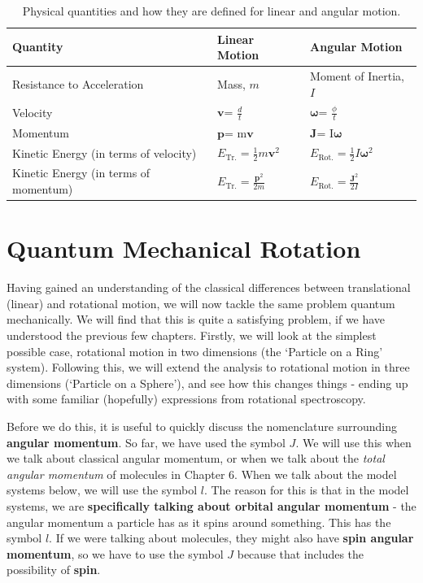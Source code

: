 \documentclass{memoir}[11pt,oneside,a4paper,openany]
\newcommand{\bv}{\ensuremath{\bm{v}}}
\newcommand{\bp}{\ensuremath{\bm{p}}}
\newcommand{\bj}{\ensuremath{\bm{J}}}
\newcommand{\bw}{\ensuremath{\bm{\omega}}}
\begin{document}
\begin{table}[]
\centering
\begin{tabular}{@{}lll@{}}
\toprule
Quantity & Linear Motion & Angular Motion \\ \midrule
Resistance to Acceleration & Mass, $m$ & Moment of Inertia, $I$  \\
Velocity  & \bv = $\frac{d}{t}$ & \bw = $\frac{\phi}{t}$ \\
Momentum & \bp = m\bv & \bj = I\bw \\
Kinetic Energy (in terms of velocity) & $E_{\text{Tr.}} = \frac{1}{2}m\bv^2$ & $E_{\text{Rot.}} = \frac{1}{2}I\bw^2$  \\
Kinetic Energy (in terms of momentum) & $E_{\text{Tr.}} = \frac{\bp^2}{2m}$ & $E_{\text{Rot.}} = \frac{\bj^2}{2I}$ \\ \bottomrule
\end{tabular}
	\caption{Physical quantities and how they are defined for linear and angular motion.}\label{tab:lin_ang}
\end{table}


\section{Quantum Mechanical Rotation}
Having gained an understanding of the classical differences between translational (linear) and rotational motion, we will now tackle the same problem quantum mechanically. We will find that this is quite a satisfying problem, if we have understood the previous few chapters. Firstly, we will look at the simplest possible case, rotational motion in two dimensions (the `Particle on a Ring' system). Following this, we will extend the analysis to rotational motion in three dimensions (`Particle on a Sphere'), and see how this changes things - ending up with some familiar (hopefully) expressions from rotational spectroscopy. 

Before we do this, it is useful to quickly discuss the nomenclature surrounding \textbf{angular momentum}. So far, we have used the symbol $J$. We will use this when we talk about classical angular momentum, or when we talk about the \emph{total angular momentum} of molecules in Chapter 6. When we talk about the model systems below, we will use the symbol $l$. The reason for this is that in the model systems, we are \textbf{specifically talking about orbital angular momentum} - the angular momentum a particle has as it spins around something. This has the symbol $l$. If we were talking about molecules, they might also have \textbf{spin angular momentum}, so we have to use the symbol $J$ because that includes the possibility of \textbf{spin}. 
\end{document}
